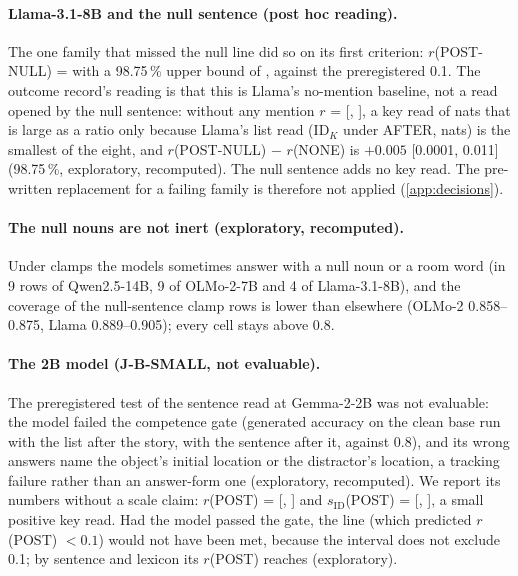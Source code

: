\paragraph{Llama-3.1-8B and the null sentence (post hoc reading).} The one family that missed the null line did so on its first criterion: $r$(POST-NULL) = \JbRPostNullLlamaEight{} with a 98.75\,\% upper bound of \JbNullRUbLlamaEight{}, against the preregistered 0.1. The outcome record's reading is that this is Llama's no-mention baseline, not a read opened by the null sentence: without any mention $r$ = \JbRNoneLlamaEight{} [\JbRNoneLlamaEightLo{}, \JbRNoneLlamaEightHi{}], a key read of \JbIDKNoneLlamaEight{} nats that is large as a ratio only because Llama's list read ($\mathrm{ID}_K$ under AFTER, \JbIDKAfterLlamaEight{} nats) is the smallest of the eight, and $r$(POST-NULL) $-$ $r$(NONE) is $+0.005$ [0.0001, 0.011] (98.75\,\%, exploratory, recomputed). The null sentence adds no key read. The pre-written replacement for a failing family is therefore not applied (\cref{app:decisions}). %

\paragraph{The null nouns are not inert (exploratory, recomputed).} Under clamps the models sometimes answer with a null noun or a room word (in 9 rows of Qwen2.5-14B, 9 of OLMo-2-7B and 4 of Llama-3.1-8B), and the coverage of the null-sentence clamp rows is lower than elsewhere (OLMo-2 0.858--0.875, Llama 0.889--0.905); every cell stays above 0.8. %

\paragraph{The 2B model (J-B-SMALL, not evaluable).} The preregistered test of the sentence read at Gemma-2-2B was not evaluable: the model failed the competence gate (generated accuracy on the clean base run \JbGfiveAccAfterGemmaTwo{} with the list after the story, \JbGfiveAccPostGemmaTwo{} with the sentence after it, against 0.8), and its wrong answers name the object's initial location or the distractor's location, a tracking failure rather than an answer-form one (exploratory, recomputed). We report its numbers without a scale claim: $r$(POST) = \JbRPostGemmaTwo{} [\JbRPostGemmaTwoLo{}, \JbRPostGemmaTwoHi{}] and $s_{\mathrm{ID}}$(POST) = \JbSidPostGemmaTwo{} [\JbSidPostGemmaTwoLo{}, \JbSidPostGemmaTwoHi{}], a small positive key read. Had the model passed the gate, the line (which predicted $r$(POST) $< 0.1$) would not have been met, because the interval does not exclude 0.1; by sentence and lexicon its $r$(POST) reaches \JbLevelRPostGemmaTwoMax{} (exploratory).

